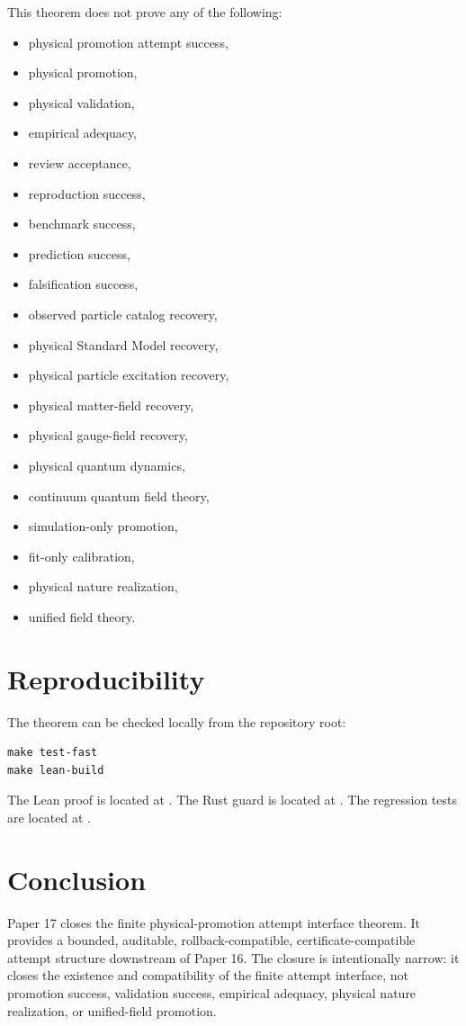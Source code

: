 \documentclass{article}
\begin{document}
This theorem does not prove any of the following:
\begin{itemize}
\item physical promotion attempt success,
\item physical promotion,
\item physical validation,
\item empirical adequacy,
\item review acceptance,
\item reproduction success,
\item benchmark success,
\item prediction success,
\item falsification success,
\item observed particle catalog recovery,
\item physical Standard Model recovery,
\item physical particle excitation recovery,
\item physical matter-field recovery,
\item physical gauge-field recovery,
\item physical quantum dynamics,
\item continuum quantum field theory,
\item simulation-only promotion,
\item fit-only calibration,
\item physical nature realization,
\item unified field theory.
\end{itemize}

\section{Reproducibility}

The theorem can be checked locally from the repository root:
\begin{verbatim}
make test-fast
make lean-build
\end{verbatim}
The Lean proof is located at
. The Rust
guard is located at . The regression tests
are located at
.

\section{Conclusion}

Paper 17 closes the finite physical-promotion attempt interface theorem. It
provides a bounded, auditable, rollback-compatible, certificate-compatible
attempt structure downstream of Paper 16. The closure is intentionally narrow:
it closes the existence and compatibility of the finite attempt interface, not
promotion success, validation success, empirical adequacy, physical nature
realization, or unified-field promotion.
\end{document}
